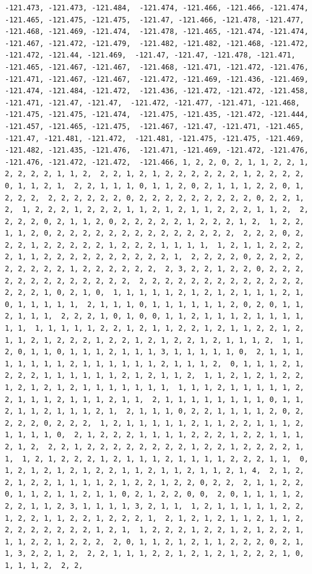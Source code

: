 \documentclass[
]{article}
\begin{document}
\begin{verbatim}
-121.473, -121.473, -121.484,  -121.474, -121.466, -121.466, -121.474, -121.465, -121.475, -121.475,  -121.47, -121.466, -121.478, -121.477, -121.468, -121.469, -121.474,  -121.478, -121.465, -121.474, -121.474, -121.467, -121.472, -121.479,  -121.482, -121.482, -121.468, -121.472, -121.472, -121.44, -121.469,  -121.47, -121.47, -121.478, -121.471, -121.465, -121.467, -121.467,  -121.468, -121.471, -121.472, -121.476, -121.471, -121.467, -121.467,  -121.472, -121.469, -121.436, -121.469, -121.474, -121.484, -121.472,  -121.436, -121.472, -121.472, -121.458, -121.471, -121.47, -121.47,  -121.472, -121.477, -121.471, -121.468, -121.475, -121.475, -121.474,  -121.475, -121.435, -121.472, -121.444, -121.457, -121.465, -121.475,  -121.467, -121.47, -121.471, -121.465, -121.47, -121.481, -121.472,  -121.481, -121.475, -121.475, -121.469, -121.482, -121.435, -121.476,  -121.471, -121.469, -121.472, -121.476, -121.476, -121.472, -121.472,  -121.466, 1, 2, 2, 0, 2, 1, 1, 2, 2, 1, 2, 2, 2, 2, 1, 1, 2,  2, 2, 1, 2, 1, 2, 2, 2, 2, 2, 2, 1, 2, 2, 2, 2, 0, 1, 1, 2, 1,  2, 2, 1, 1, 1, 0, 1, 1, 2, 0, 2, 1, 1, 1, 2, 2, 0, 1, 2, 2, 2,  2, 2, 2, 2, 2, 2, 0, 2, 2, 2, 2, 2, 2, 2, 2, 2, 0, 2, 2, 1, 2,  1, 2, 2, 2, 1, 2, 2, 2, 1, 1, 2, 1, 2, 1, 1, 2, 2, 2, 1, 1, 2,  2, 2, 2, 2, 0, 2, 1, 1, 2, 0, 2, 2, 2, 2, 2, 1, 2, 2, 2, 1, 2,  1, 2, 2, 1, 1, 2, 0, 2, 2, 2, 2, 2, 2, 2, 2, 2, 2, 2, 2, 2, 2,  2, 2, 2, 0, 2, 2, 2, 1, 2, 2, 2, 2, 2, 1, 2, 2, 2, 1, 1, 1, 1,  1, 2, 1, 1, 2, 2, 2, 2, 1, 1, 2, 2, 2, 2, 2, 2, 2, 2, 2, 2, 1,  2, 2, 2, 2, 0, 2, 2, 2, 2, 2, 2, 2, 2, 2, 1, 2, 2, 2, 2, 2, 2,  2, 3, 2, 2, 1, 2, 2, 0, 2, 2, 2, 2, 2, 2, 2, 2, 2, 2, 2, 2, 2,  2, 2, 2, 2, 2, 2, 2, 2, 2, 2, 2, 2, 2, 2, 2, 2, 1, 0, 2, 1, 0,  1, 1, 1, 1, 1, 2, 1, 2, 1, 2, 1, 1, 1, 2, 1, 0, 1, 1, 1, 1, 1,  2, 1, 1, 1, 0, 1, 1, 1, 1, 1, 1, 2, 0, 2, 0, 1, 1, 2, 1, 1, 1,  2, 2, 2, 1, 0, 1, 0, 0, 1, 1, 2, 1, 1, 1, 2, 1, 1, 1, 1, 1, 1,  1, 1, 1, 1, 1, 2, 2, 1, 2, 1, 1, 2, 2, 1, 2, 1, 1, 2, 2, 1, 2,  1, 1, 2, 1, 2, 2, 2, 1, 2, 2, 1, 2, 1, 2, 2, 1, 2, 1, 1, 1, 2,  1, 1, 2, 0, 1, 1, 0, 1, 1, 1, 2, 1, 1, 1, 3, 1, 1, 1, 1, 1, 0,  2, 1, 1, 1, 1, 1, 1, 1, 1, 2, 1, 1, 1, 1, 1, 1, 2, 1, 1, 1, 2,  0, 1, 1, 1, 2, 1, 2, 2, 2, 1, 1, 1, 1, 1, 1, 2, 1, 2, 1, 1, 2,  1, 1, 2, 1, 2, 1, 2, 2, 1, 2, 1, 2, 1, 2, 1, 1, 1, 1, 1, 1, 1,  1, 1, 1, 2, 1, 1, 1, 1, 1, 2, 2, 1, 1, 1, 2, 1, 1, 1, 2, 1, 1,  2, 1, 1, 1, 1, 1, 1, 1, 1, 0, 1, 1, 2, 1, 1, 2, 1, 1, 1, 2, 1,  2, 1, 1, 1, 0, 2, 2, 1, 1, 1, 1, 2, 0, 2, 2, 2, 2, 0, 2, 2, 2,  1, 2, 1, 1, 1, 1, 1, 2, 1, 1, 2, 2, 1, 1, 1, 2, 1, 1, 1, 1, 0,  2, 1, 2, 2, 2, 1, 1, 1, 1, 2, 2, 2, 1, 2, 2, 1, 1, 1, 2, 1, 2,  2, 2, 1, 2, 2, 2, 2, 2, 2, 2, 2, 1, 2, 2, 1, 2, 2, 2, 2, 1, 1,  1, 2, 1, 2, 2, 2, 1, 2, 1, 1, 1, 2, 1, 1, 1, 1, 2, 2, 2, 1, 1,  0, 1, 2, 1, 2, 1, 2, 1, 2, 2, 1, 1, 2, 1, 1, 2, 1, 1, 2, 1, 4,  2, 1, 2, 2, 1, 2, 2, 1, 1, 1, 1, 2, 1, 2, 2, 1, 2, 2, 0, 2, 2,  2, 1, 1, 2, 2, 0, 1, 1, 2, 1, 1, 2, 1, 1, 0, 2, 1, 2, 2, 0, 0,  2, 0, 1, 1, 1, 1, 2, 2, 2, 1, 1, 2, 3, 1, 1, 1, 1, 3, 2, 1, 1,  1, 2, 1, 1, 1, 1, 1, 2, 2, 1, 2, 2, 1, 1, 2, 2, 1, 2, 2, 2, 1,  2, 1, 2, 1, 2, 1, 1, 2, 1, 1, 2, 2, 2, 2, 2, 2, 2, 2, 1, 2, 1,  1, 2, 2, 2, 1, 2, 2, 1, 2, 1, 2, 2, 1, 1, 1, 2, 2, 1, 2, 2, 2,  2, 0, 1, 1, 2, 1, 2, 1, 1, 2, 2, 2, 0, 2, 1, 1, 3, 2, 2, 1, 2,  2, 2, 1, 1, 1, 2, 2, 1, 2, 1, 2, 1, 2, 2, 2, 1, 0, 1, 1, 1, 2,  2, 2, 
\end{verbatim}
\end{document}
